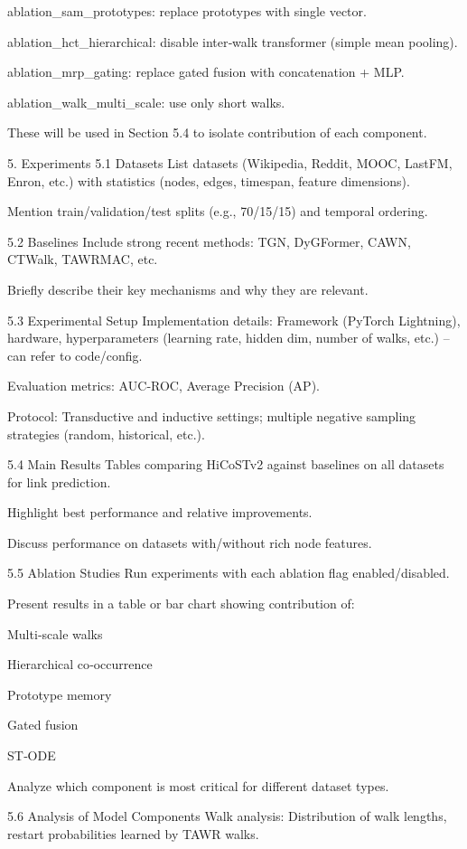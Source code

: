 \documentclass{report}
\begin{document}
ablation_sam_prototypes: replace prototypes with single vector.

ablation_hct_hierarchical: disable inter‑walk transformer (simple mean pooling).

ablation_mrp_gating: replace gated fusion with concatenation + MLP.

ablation_walk_multi_scale: use only short walks.

These will be used in Section 5.4 to isolate contribution of each component.

5. Experiments
5.1 Datasets
List datasets (Wikipedia, Reddit, MOOC, LastFM, Enron, etc.) with statistics (nodes, edges, timespan, feature dimensions).

Mention train/validation/test splits (e.g., 70/15/15) and temporal ordering.

5.2 Baselines
Include strong recent methods: TGN, DyGFormer, CAWN, CTWalk, TAWRMAC, etc.

Briefly describe their key mechanisms and why they are relevant.

5.3 Experimental Setup
Implementation details: Framework (PyTorch Lightning), hardware, hyperparameters (learning rate, hidden dim, number of walks, etc.) – can refer to code/config.

Evaluation metrics: AUC‑ROC, Average Precision (AP).

Protocol: Transductive and inductive settings; multiple negative sampling strategies (random, historical, etc.).

5.4 Main Results
Tables comparing HiCoSTv2 against baselines on all datasets for link prediction.

Highlight best performance and relative improvements.

Discuss performance on datasets with/without rich node features.

5.5 Ablation Studies
Run experiments with each ablation flag enabled/disabled.

Present results in a table or bar chart showing contribution of:

Multi‑scale walks

Hierarchical co‑occurrence

Prototype memory

Gated fusion

ST‑ODE

Analyze which component is most critical for different dataset types.

5.6 Analysis of Model Components
Walk analysis: Distribution of walk lengths, restart probabilities learned by TAWR walks.
\end{document}
